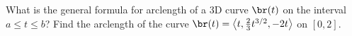 What is the general formula for arclength of a 3D curve $\br(t)$ on the interval $a \le t \le b$?  Find the arclength of the curve $\br(t) = \left<t,\frac{2}{3} t^{3/2},-2t\right>$ on $[0,2]$.